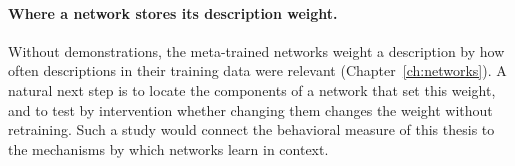 \paragraph{Where a network stores its description weight.}
Without demonstrations, the meta-trained networks weight a description by how often descriptions in their training data were relevant (Chapter~\ref{ch:networks}). A natural next step is to locate the components of a network that set this weight, and to test by intervention whether changing them changes the weight without retraining. Such a study would connect the behavioral measure of this thesis to the mechanisms by which networks learn in context.
